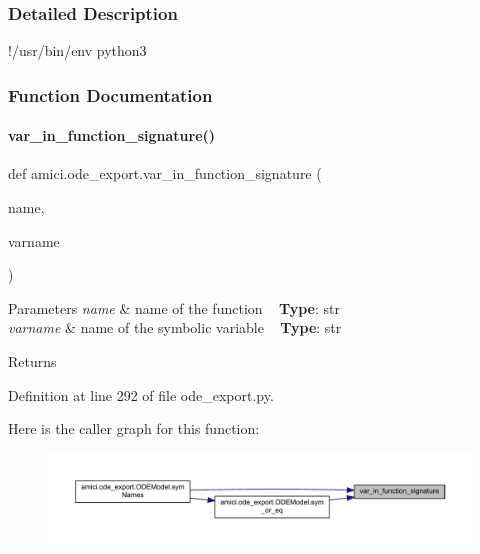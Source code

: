 \subsubsection{Detailed Description}
!/usr/bin/env python3 

\subsubsection{Function Documentation}
\mbox{\label{namespaceamici_1_1ode__export_a365aaf8b78bb2db9c94b1a8087d60a16}} 
\paragraph{\texorpdfstring{var\_in\_function\_signature()}{var\_in\_function\_signature()}}
{\footnotesize\ttfamily def amici.\+ode\+\_\+export.\+var\+\_\+in\+\_\+function\+\_\+signature (\begin{DoxyParamCaption}\item[{}]{name,  }\item[{}]{varname }\end{DoxyParamCaption})}


\begin{DoxyParams}{Parameters}
{\em name} & name of the function ~\newline
{\bfseries{Type}}\+: str\\
\hline
{\em varname} & name of the symbolic variable ~\newline
{\bfseries{Type}}\+: str\\
\hline
\end{DoxyParams}
\begin{DoxyReturn}{Returns}

\end{DoxyReturn}


Definition at line 292 of file ode\+\_\+export.\+py.

Here is the caller graph for this function\+:
\nopagebreak
\begin{figure}[H]
\begin{center}
\leavevmode
\includegraphics[width=350pt]{namespaceamici_1_1ode__export_a365aaf8b78bb2db9c94b1a8087d60a16_icgraph}
\end{center}
\end{figure}
\mbox{\label{namespaceamici_1_1ode__export_aed240175cce2aa528fe24d1486c52559}} 
